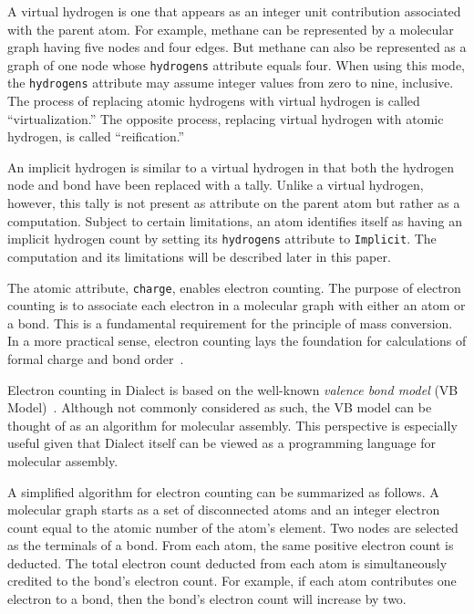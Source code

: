 \documentclass{article}
\def\ttt{\texttt}
\begin{document}
A virtual hydrogen is one that appears as an integer unit contribution associated with the parent atom. For example, methane can be represented by a molecular graph having five nodes and four edges. But methane can also be represented as a graph of one node whose \ttt{hydrogens} attribute equals four. When using this mode, the \ttt{hydrogens} attribute may assume integer values from zero to nine, inclusive. The process of replacing atomic hydrogens with virtual hydrogen is called \enquote{virtualization.} The opposite process, replacing virtual hydrogen with atomic hydrogen, is called \enquote{reification.}

An implicit hydrogen is similar to a virtual hydrogen in that both the hydrogen node and bond have been replaced with a tally. Unlike a virtual hydrogen, however, this tally is not present as attribute on the parent atom but rather as a computation. Subject to certain limitations, an atom identifies itself as having an implicit hydrogen count by setting its \ttt{hydrogens} attribute to \ttt{Implicit}. The computation and its limitations will be described later in this paper.

The atomic attribute, \ttt{charge}, enables electron counting. The purpose of electron counting is to associate each electron in a molecular graph with either an atom or a bond. This is a fundamental requirement for the principle of mass conversion. In a more practical sense, electron counting lays the foundation for calculations of formal charge and bond order~\cite{dietz:1995}.

Electron counting in Dialect is based on the well-known \textit{valence bond model} (VB Model)~\cite{lewis:1916}. Although not commonly considered as such, the VB model can be thought of as an algorithm for molecular assembly. This perspective is especially useful given that Dialect itself can be viewed as a programming language for molecular assembly.

A simplified algorithm for electron counting can be summarized as follows. A molecular graph starts as a set of disconnected atoms and an integer electron count equal to the atomic number of the atom's element. Two nodes are selected as the terminals of a bond. From each atom, the same positive electron count is deducted. The total electron count deducted from each atom is simultaneously credited to the bond's electron count. For example, if each atom contributes one electron to a bond, then the bond's electron count will increase by two.
\end{document}
